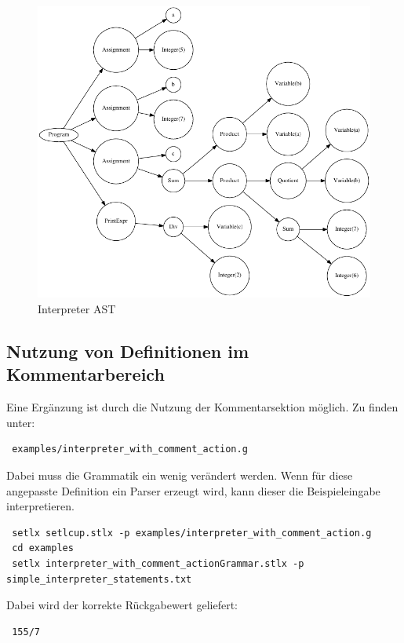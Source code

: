 \begin{figure}[!htb]
	\centering
		\includegraphics{simple_interpreter_tree.pdf}
	\caption{Interpreter AST}
	\label{fig:interpreter_tree}
\end{figure}
\subsection{Nutzung von Definitionen im Kommentarbereich}
\label{subsec:programming_language_parser}
Eine Ergänzung ist durch die Nutzung der Kommentarsektion möglich.
Zu finden unter: 
\begin{Verbatim}
 examples/interpreter_with_comment_action.g
\end{Verbatim}
Dabei muss die Grammatik ein wenig verändert werden.
Wenn für diese angepasste Definition ein Parser erzeugt wird, kann dieser die Beispieleingabe interpretieren.
\begin{Verbatim}
 setlx setlcup.stlx -p examples/interpreter_with_comment_action.g
 cd examples
 setlx interpreter_with_comment_actionGrammar.stlx -p simple_interpreter_statements.txt
\end{Verbatim}
Dabei wird der korrekte Rückgabewert geliefert:
\begin{Verbatim}
 155/7
\end{Verbatim}

